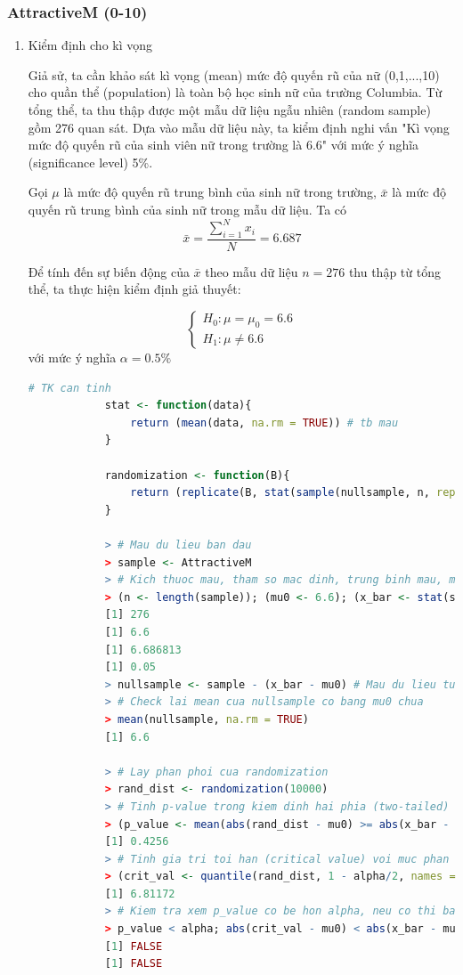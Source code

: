 \documentclass[a4paper,12pt]{article}
\begin{document}
	\subsubsection{AttractiveM (0-10)}
	\begin{enumerate}[label = \alph*)]
		\item Kiểm định cho kì vọng \label{1a}
	
			Giả sử, ta cần khảo sát kì vọng (mean) mức độ quyến rũ của nữ (0,1,...,10) cho quần thể (population) là toàn bộ học sinh nữ của trường Columbia. Từ tổng thể, ta thu thập được một mẫu dữ liệu ngẫu nhiên (random sample) gồm 276 quan sát. Dựa vào mẫu dữ liệu này, ta kiểm định nghi vấn "Kì vọng mức độ quyến rũ của sinh viên nữ trong trường là 6.6" với mức ý nghĩa (significance level) 5\%.
			
			Gọi $\mu$ là mức độ quyến rũ trung bình của sinh nữ trong trường, $\bar{x}$ là mức độ quyến rũ trung bình của sinh nữ
			trong mẫu dữ liệu. Ta có
			$$\bar{x} = \frac{\sum_{i = 1}^{N}x_i}{N} =  6.687$$
			
			Để tính đến sự biến động của $\bar{x}$ theo mẫu dữ liệu $n = 276$ thu thập từ tổng thể, ta thực hiện kiểm định giả thuyết:
			
			\begin{equation*}
			\begin{cases}
			H_0: \mu = \mu_0 = 6.6\\
			H_1: \mu \neq 6.6
			\end{cases}
			\end{equation*}
			với mức ý nghĩa $\alpha = 0.5\%$
			
			\begin{lstlisting}[language=R]
			# TK can tinh
			stat <- function(data){
				return (mean(data, na.rm = TRUE)) # tb mau
			}
			
			randomization <- function(B){
				return (replicate(B, stat(sample(nullsample, n, replace = TRUE))))
			}
			
			> # Mau du lieu ban dau
			> sample <- AttractiveM
			> # Kich thuoc mau, tham so mac dinh, trung binh mau, muc y nghia
			> (n <- length(sample)); (mu0 <- 6.6); (x_bar <- stat(sample)); (alpha <- 0.05)
			[1] 276
			[1] 6.6
			[1] 6.686813
			[1] 0.05
			> nullsample <- sample - (x_bar - mu0) # Mau du lieu tuong ung voi H0
			> # Check lai mean cua nullsample co bang mu0 chua
			> mean(nullsample, na.rm = TRUE)
			[1] 6.6
			 
			> # Lay phan phoi cua randomization
			> rand_dist <- randomization(10000)
			> # Tinh p-value trong kiem dinh hai phia (two-tailed)
			> (p_value <- mean(abs(rand_dist - mu0) >= abs(x_bar - mu0)))
			[1] 0.4256
			> # Tinh gia tri toi han (critical value) voi muc phan vi 1-alpha/2
			> (crit_val <- quantile(rand_dist, 1 - alpha/2, names = FALSE))
			[1] 6.81172
			> # Kiem tra xem p_value co be hon alpha, neu co thi bac bo H0
			> p_value < alpha; abs(crit_val - mu0) < abs(x_bar - mu0)
			[1] FALSE
			[1] FALSE
			\end{lstlisting}
			

\end{enumerate}
\end{document}
